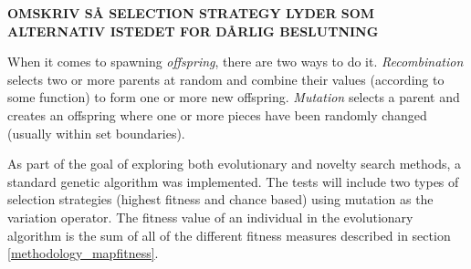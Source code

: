 \textbf{OMSKRIV SÅ SELECTION STRATEGY LYDER SOM ALTERNATIV ISTEDET FOR DÅRLIG BESLUTNING}

When it comes to spawning \textit{offspring}, there are two ways to do it\cite[Chapter 2]{shaker2015procedural}. \textit{Recombination} selects two or more parents at random and combine their values (according to some function) to form one or more new offspring. \textit{Mutation} selects a parent and creates an offspring where one or more pieces have been randomly changed (usually within set boundaries). 

As part of the goal of exploring both evolutionary and novelty search methods, a standard genetic algorithm was implemented. The tests will include two types of selection strategies (highest fitness and chance based) using mutation as the variation operator. The fitness value of an individual in the evolutionary algorithm is the sum of all of the different fitness measures described in section \ref{methodology_mapfitness}.